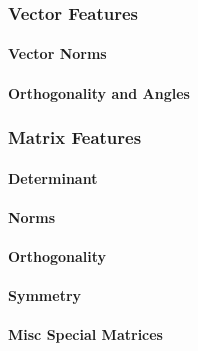 \subsubsection{Vector Features}

\paragraph{Vector Norms}

\paragraph{Orthogonality and Angles}
% 

\subsubsection{Matrix Features}

\paragraph{Determinant}

\paragraph{Norms}

\paragraph{Orthogonality}

\paragraph{Symmetry}

\paragraph{Misc Special Matrices}










